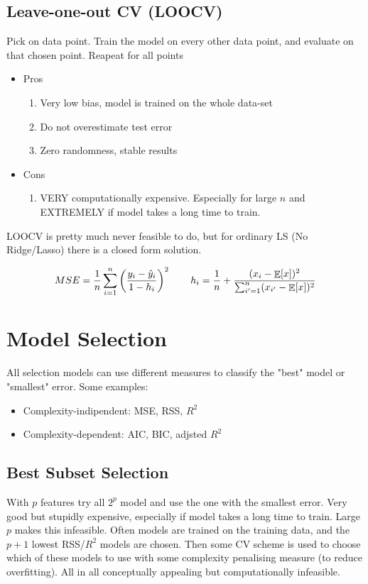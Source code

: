 \documentclass{article}
\DeclareMathOperator*{\E}{\mathbb{E}}
\begin{document}
\subsection{Leave-one-out CV (LOOCV)}
Pick on data point. Train the model on every other data point, and evaluate on that chosen point. Reapeat for all points

\begin{itemize}
    \item Pros
    \begin{enumerate}
        \item Very low bias, model is trained on the whole data-set
        \item Do not overestimate test error
        \item Zero randomness, stable results
    \end{enumerate}
    \item Cons
        \begin{enumerate}
            \item VERY computationally expensive. Especially for large $n$ and EXTREMELY if model takes a long time to train. 
        \end{enumerate}
\end{itemize}

LOOCV is pretty much never feasible to do, but for ordinary LS (No Ridge/Lasso) there is a closed form solution.

\begin{align*}
    MSE = \frac{1}{n} \sum_{i=1}^{n} \left( \frac{y_i - \hat{y}_i}{1 - h_i} \right)^2 \hspace{20px} h_i = \frac{1}{n} + \frac{(x_i-\E[{x}])^2}{\sum_{i'=1}^{n} (x_{i'}-\E[{x}])^2}
\end{align*}


\section{Model Selection}
All selection models can use different measures to classify the "best" model or "smallest" error. Some examples:

\begin{itemize}
    \item Complexity-indipendent: MSE, RSS, $R^2$
    \item Complexity-dependent: AIC, BIC, adjsted $R^2$
\end{itemize}


\subsection{Best Subset Selection}
With $p$ features try all $2^p$ model and use the one with the smallest error. Very good but stupidly expensive, especially if model takes a long time to train. Large $p$ makes this infeasible. Often models are trained on the training data, and the $p+1$ lowest RSS/$R^2$ models are chosen. Then some CV scheme is used to choose which of these models to use with some complexity penalising measure (to reduce overfitting). All in all conceptually appealing but computationally infeasible. 
\end{document}
